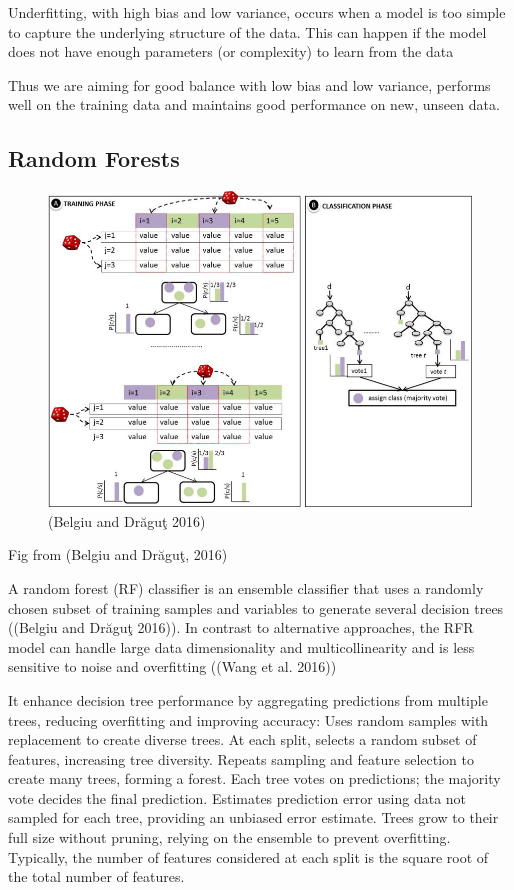 \documentclass[
  letterpaper,
  DIV=11,
  numbers=noendperiod]{scrreprt}
\begin{document}
Underfitting, with high bias and low variance, occurs when a model is
too simple to capture the underlying structure of the data. This can
happen if the model does not have enough parameters (or complexity) to
learn from the data

Thus we are aiming for good balance with low bias and low variance,
performs well on the training data and maintains good performance on
new, unseen data.

\subsection{Random Forests}\label{random-forests}

\begin{figure}[H]

{\centering \includegraphics{RF.png}

}

\caption{(Belgiu and Drăguţ 2016)}

\end{figure}%

Fig from (Belgiu and Drăguţ, 2016)

A random forest (RF) classifier is an ensemble classifier that uses a
randomly chosen subset of training samples and variables to generate
several decision trees ((Belgiu and Drăguţ 2016)). In contrast to
alternative approaches, the RFR model can handle large data
dimensionality and multicollinearity and is less sensitive to noise and
overfitting ((Wang et al. 2016))

It enhance decision tree performance by aggregating predictions from
multiple trees, reducing overfitting and improving accuracy: Uses random
samples with replacement to create diverse trees. At each split, selects
a random subset of features, increasing tree diversity. Repeats sampling
and feature selection to create many trees, forming a forest. Each tree
votes on predictions; the majority vote decides the final prediction.
Estimates prediction error using data not sampled for each tree,
providing an unbiased error estimate. Trees grow to their full size
without pruning, relying on the ensemble to prevent overfitting.
Typically, the number of features considered at each split is the square
root of the total number of features.
\end{document}
